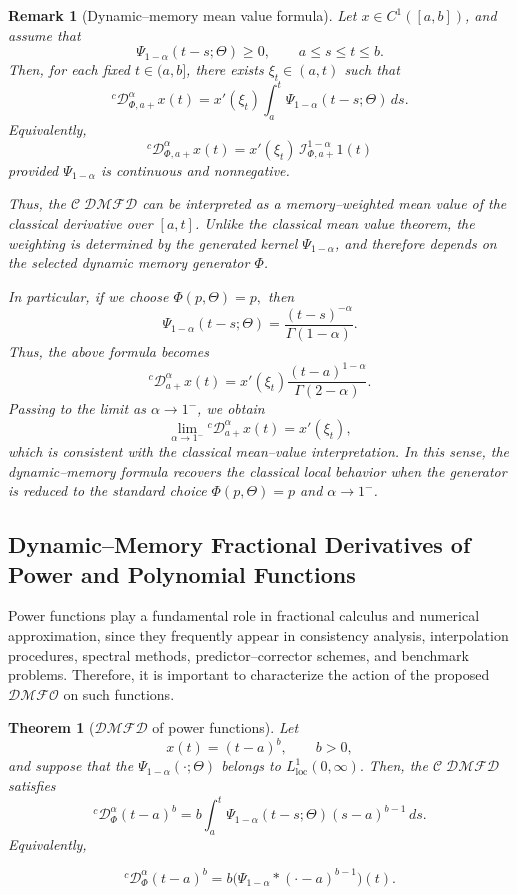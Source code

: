\documentclass[11pt]{article}
\numberwithin{equation}{section}
\newtheorem{theorem}[definition]{Theorem}
\newtheorem{remark}[definition]{Remark}
\begin{document}
\begin{remark}[Dynamic--memory mean value formula]
Let \(x\in C^1([a,b])\), and assume that
\[
\Psi_{1-\alpha}(t-s;\Theta)\ge 0,
\qquad a\le s\le t\le b.
\]
Then, for each fixed \(t\in(a,b]\), there exists
\(\xi_t\in(a,t)\) such that
\[
{}^c \mathcal D_{\Phi,a+}^{\alpha}x(t)
=
x'(\xi_t)
\int_a^t \Psi_{1-\alpha}(t-s;\Theta)\,ds.
\]
Equivalently,
\[
{}^c \mathcal D_{\Phi,a+}^{\alpha}x(t)
=
x'(\xi_t)\,
\mathcal I_{\Phi,a+}^{1-\alpha}1(t)
\]
provided
\(
\Psi_{1-\alpha}
\)
is continuous and nonnegative.

Thus, the $\mathcal{C\;DMFD}$ can be interpreted as
a memory--weighted mean value of the classical derivative over \([a,t]\).
Unlike the classical mean value theorem, the weighting is determined by the
generated kernel \(\Psi_{1-\alpha}\), and therefore depends on the selected
dynamic memory generator \(\Phi\).

In particular, if we choose
\(
\Phi(p,\Theta)=p,
\)
then
\[
\Psi_{1-\alpha}(t-s;\Theta)
=
\frac{(t-s)^{-\alpha}}{\Gamma(1-\alpha)}.
\]
Thus, the above formula becomes
\[
{}^c \mathcal D_{a+}^{\alpha}x(t)
=
x'(\xi_t)
\frac{(t-a)^{1-\alpha}}{\Gamma(2-\alpha)}.
\]
Passing to the limit as \(\alpha\to1^{-}\), we obtain
\[
\lim_{\alpha\to1^-}{}^c \mathcal D_{a+}^{\alpha}x(t)
=
x'(\xi_t),
\]
which is consistent with the classical mean--value interpretation. In this sense,
the dynamic--memory formula recovers the classical local behavior when the
generator is reduced to the standard choice \(\Phi(p,\Theta)=p\) and
\(\alpha\to1^{-}\).
\end{remark}

\subsection{Dynamic--Memory Fractional Derivatives of Power and Polynomial Functions}

Power functions play a fundamental role in fractional calculus and numerical approximation,
since they frequently appear in consistency analysis, interpolation procedures, spectral
methods, predictor--corrector schemes, and benchmark problems. Therefore, it is important
to characterize the action of the proposed $\mathcal{DMFO}$ on such functions.

\begin{theorem}[$\mathcal{DMFD}$ of power functions]\label{328}
Let
\[
x(t)
=
(t-a)^b,
\qquad
b>0,
\]
and suppose that the 
\(
\Psi_{1-\alpha}(\cdot;\Theta)
\)
belongs to
\(
L^1_{\mathrm{loc}}(0,\infty).
\)
Then, the $\mathcal{C\;DMFD}$ satisfies
\[
{}^c \mathcal D_\Phi^\alpha
(t-a)^b
=
b
\int_a^t
\Psi_{1-\alpha}(t-s;\Theta)
(s-a)^{b-1}
\,ds.
\]
Equivalently,

\[
{}^c \mathcal D_\Phi^\alpha
(t-a)^b
=
b
\Big(
\Psi_{1-\alpha}
*
(\cdot-a)^{b-1}
\Big)(t).
\]

\end{theorem}
\end{document}

